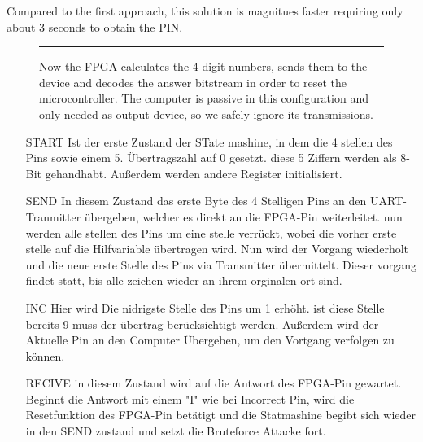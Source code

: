 Compared to the first approach, this solution is magnitues faster requiring only about 3 seconds to obtain the PIN.

\begin{figure}[tb]
    \begin{center}
        
        \caption{Now the FPGA calculates the 4 digit numbers, sends them to the device and decodes the answer bitstream in order to reset the microcontroller. The computer is passive in this configuration and only needed as output device, so we safely ignore its transmissions.}
        \label{as4-schematic-2}
        \vspace{1em}\hrule
    \end{center}
\end{figure}


\begin{itemize}


\item[START] Ist der erste Zustand der STate mashine, in dem die 4 stellen des Pins sowie einem 5. Übertragszahl auf 0 gesetzt. diese 5 Ziffern werden als 8-Bit gehandhabt. Außerdem werden andere Register initialisiert.

\item[SEND] In diesem Zustand das erste Byte des 4 Stelligen Pins an den UART-Tranmitter übergeben, welcher es direkt an die FPGA-Pin weiterleitet. nun werden alle stellen des Pins um eine stelle verrückt, wobei die vorher erste stelle auf die Hilfvariable übertragen wird. Nun wird der Vorgang wiederholt und die neue erste Stelle des Pins via Transmitter übermittelt. Dieser vorgang findet statt, bis alle zeichen wieder an ihrem orginalen ort sind. 

\item[INC] Hier wird Die nidrigste Stelle des Pins um 1 erhöht. ist diese Stelle bereits 9 muss der übertrag berücksichtigt werden. Außerdem wird der Aktuelle Pin an den Computer Übergeben, um den Vortgang verfolgen zu können.

\item[RECIVE] in diesem Zustand wird auf die Antwort des FPGA-Pin gewartet. Beginnt die Antwort mit einem "I" wie bei Incorrect Pin, wird die Resetfunktion des FPGA-Pin betätigt und die Statmashine begibt sich wieder in den SEND zustand und setzt die Bruteforce Attacke fort.

\end{itemize}


